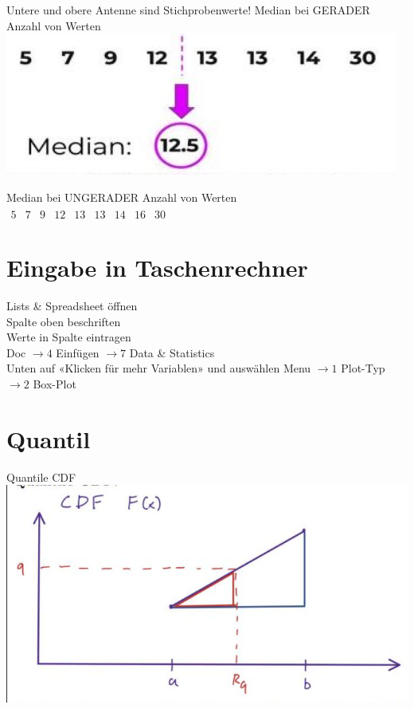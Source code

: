\documentclass[10pt]{article}
\begin{document}
Untere und obere Antenne sind Stichprobenwerte! Median bei GERADER Anzahl von Werten\\
\includegraphics[width=\linewidth]{images/2024_12_29_0906b02acf849bda8665g-1(7)}

Median bei UNGERADER Anzahl von Werten\\
$\begin{array}{llllllllllllllll}5 & 7 & 9 & 12 & 13 & 13 & 14 & 16 & 30\end{array}$

\section*{Eingabe in Taschenrechner}
Lists \& Spreadsheet öffnen\\
Spalte oben beschriften\\
Werte in Spalte eintragen\\
Doc $\rightarrow 4$ Einfügen $\rightarrow 7$ Data \& Statistics\\
Unten auf «Klicken für mehr Variablen» und auswählen Menu $\rightarrow 1$ Plot-Typ $\rightarrow 2$ Box-Plot

\section*{Quantil}
Quantile CDF\\
\includegraphics[width=\linewidth]{images/2024_12_29_0906b02acf849bda8665g-1(2)}
\end{document}
